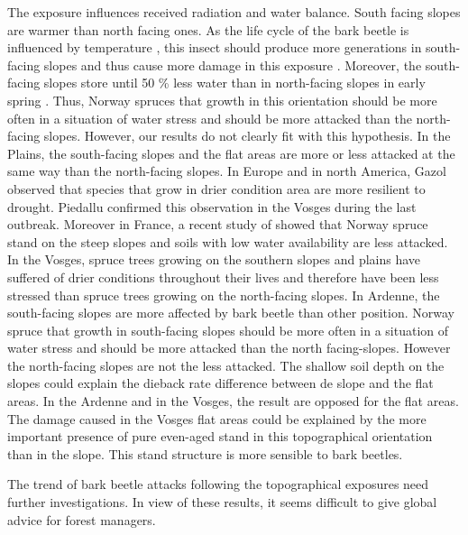 \documentclass[3p,procedia]{elsarticle}
\begin{document}
The exposure  influences received radiation and water balance.
South facing slopes are warmer than north facing ones. %
As the life cycle of the bark beetle is influenced by temperature \citep{baier_phenipscomprehensive_2007},
this insect should produce more generations in south-facing slopes and thus cause  more damage in this exposure \citep{jakus_1995}.
Moreover, the south-facing slopes store until 50 \% less water than in north-facing slopes in early spring \citep{Rouse_1969}.
Thus, Norway spruces that growth in this orientation should be more often in a situation of water stress and should be more attacked than the north-facing slopes.
However, our results do not  clearly fit with this hypothesis. In the Plains, the south-facing slopes and the flat areas are more or less attacked at the same way than the north-facing slopes. In Europe and in north America, Gazol \citep{gazol_2017} observed that species that grow in drier condition area are more resilient to drought.
Piedallu \citep{piedallu_spatial_2022} confirmed this observation in the Vosges during the last outbreak.
Moreover in France, a recent study of \cite{nardi_drought_2022} showed that Norway spruce stand on the steep slopes and soils with low water availability are less attacked.
In the Vosges, spruce trees growing on the southern slopes and plains have suffered of drier conditions throughout their lives and therefore have been less stressed than spruce trees growing on the north-facing slopes.
In Ardenne, the south-facing slopes are more affected by bark beetle than other position.
Norway spruce that growth in south-facing slopes should be more often in a situation of water stress and should be more attacked than the north facing-slopes.
However the north-facing slopes are not the less attacked. 
The shallow soil depth on the slopes could explain the dieback rate difference between de slope and the flat areas. 
In the Ardenne and in the Vosges, the result are opposed for the flat areas.
The damage caused in the Vosges flat areas  could be explained by the more important presence of pure even-aged stand in this topographical orientation than in the slope.
This stand structure is more sensible to bark beetles.

The trend of bark beetle attacks following the topographical exposures need further investigations.
In view of these results, it seems difficult to give global advice for forest managers.
\end{document}
